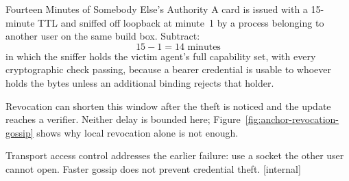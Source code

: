 \documentclass[11pt,a4paper]{article}
\theoremstyle{definition}
\begin{document}
\begin{pdexample}{Fourteen Minutes of Somebody Else's Authority}
\setlength{\parskip}{4pt plus 1pt}
A card is issued with a 15-minute TTL and sniffed off loopback at minute~1 by
a process belonging to another user on the same build box. Subtract:
\[
15 - 1 = 14 \text{ minutes}
\]
in which the sniffer holds the victim agent's full
capability set, with every cryptographic check passing, because a bearer
credential is usable to whoever holds the bytes unless an additional binding
rejects that holder.

Revocation can shorten this window after the theft is
noticed and the update reaches a verifier. Neither delay is bounded here;
Figure~\ref{fig:anchor-revocation-gossip} shows why local revocation alone is
not enough.

Transport access control addresses the earlier failure: use a socket
the other user cannot open. Faster gossip does not prevent credential theft.
[internal]
\end{pdexample}
\end{document}
